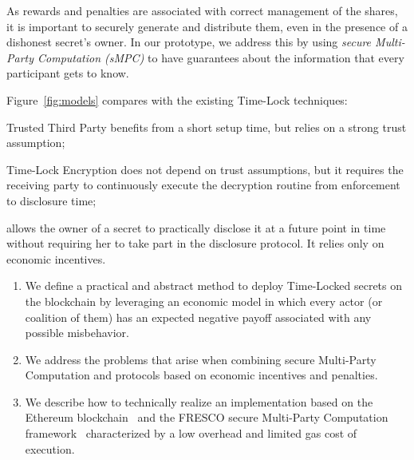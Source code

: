 As rewards and penalties are associated with correct management of the shares, it is important to securely generate and distribute them, even in the presence of a dishonest secret's owner.
In our prototype, we address this by using {\em secure Multi-Party Computation (sMPC)} to have guarantees about the information that every participant gets to know.

Figure~\ref{fig:models} compares \shortname with the existing Time-Lock techniques:

\begin{compactitem}
	\item Trusted Third Party benefits from a short setup time,
          but relies on a strong trust assumption;
	
	\item Time-Lock Encryption does not depend on trust assumptions, but it requires the receiving party to continuously execute the decryption routine from enforcement to disclosure time;
	
	\item {\em \name} allows the owner of a secret to practically disclose it at a future point in time without requiring her to take part in the disclosure protocol. It relies only on economic incentives.
\end{compactitem}


\begin{enumerate}

	\smallskip
 	\item We define a practical and abstract method to deploy Time-Locked secrets on the blockchain by leveraging an economic model in which every actor (or coalition of them) has an expected negative payoff associated with any possible misbehavior.
 	
 	\smallskip
 	\item We address the problems that arise when combining secure Multi-Party Computation and protocols based on economic incentives and penalties. 
  
  	\smallskip
 	\item We describe how to technically realize an implementation based on the Ethereum blockchain~\cite{wood2014ethereum} and the FRESCO secure Multi-Party Computation framework~\cite{damgaard2016mpc} characterized by a low overhead and limited gas cost of execution.

\end{enumerate}

